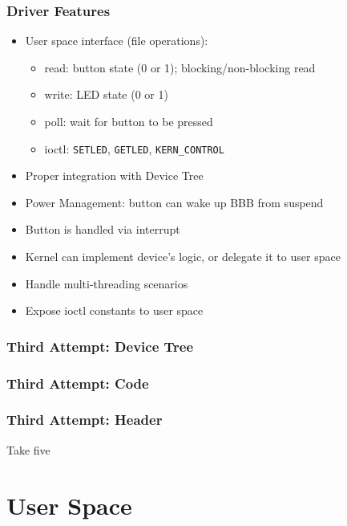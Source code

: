 \documentclass[aspectratio=169,usenames,dvipsnames]{beamer}
\newcounter{cont}
\begin{document}
\begin{frame}
  \frametitle{Driver Features}
  \begin{itemize}
    \item User space interface (file operations):
      \begin{itemize}
        \item read: button state (0 or 1); blocking/non-blocking read
        \item write: LED state (0 or 1)
        \item poll: wait for button to be pressed
        \item ioctl: \texttt{SETLED}, \texttt{GETLED}, \texttt{KERN\_CONTROL}
      \end{itemize}
    \item Proper integration with Device Tree
    \item Power Management: button can wake up BBB from suspend
    \item Button is handled via interrupt
    \item Kernel can implement device's logic, or delegate it to user space
    \item Handle multi-threading scenarios
    \item Expose ioctl constants to user space
  \end{itemize}
\end{frame}

\begin{frame}[containsverbatim]
  \frametitle{Third Attempt: Device Tree}
  
  \vspace*{-5mm}
\end{frame}

\begin{frame}[containsverbatim,allowframebreaks=1]
  \frametitle{Third Attempt: Code}
  
\end{frame}

\begin{frame}[containsverbatim]
  \frametitle{Third Attempt: Header}
  
\end{frame}

\begin{frame}[standout]
  Take five
\end{frame}

\section{User Space}
\end{document}
